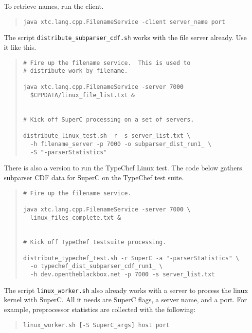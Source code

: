 \documentclass{report}
\newcommand{\SuperC}{{\textsf{Su\-perC}}}
\begin{document}
To retrieve names, run the client.

\begin{quote}
\begin{verbatim}
java xtc.lang.cpp.FilenameService -client server_name port
\end{verbatim}
\end{quote}

The script \verb"distribute_subparser_cdf.sh" works with the file server already.  Use it like this.

\begin{quote}
\begin{verbatim}
# Fire up the filename service.  This is used to
# distribute work by filename.

java xtc.lang.cpp.FilenameService -server 7000
  $CPPDATA/linux_file_list.txt &


# Kick off SuperC processing on a set of servers.

distribute_linux_test.sh -r -s server_list.txt \
  -h filename_server -p 7000 -o subparser_dist_run1_ \
  -S "-parserStatistics"
\end{verbatim}
\end{quote}

There is also a version to run the TypeChef Linux test.  The code
below gathers subparser CDF data for SuperC on the TypeChef test
suite.

\begin{quote}
\begin{verbatim}
# Fire up the filename service.

java xtc.lang.cpp.FilenameService -server 7000 \
  linux_files_complete.txt &


# Kick off TypeChef testsuite processing.

distribute_typechef_test.sh -r SuperC -a "-parserStatistics" \
  -o typechef_dist_subparser_cdf_run1_ \
  -h dev.opentheblackbox.net -p 7000 -s server_list.txt
\end{verbatim}
\end{quote}


The script \verb"linux_worker.sh" also already works with a server to
process the linux kernel with \SuperC{}.  All it needs are \SuperC{}
flags, a server name, and a port.  For example, preprocessor
statistics are collected with the following:


\begin{quote}
\begin{verbatim}
linux_worker.sh [-S SuperC_args] host port
\end{verbatim}
\end{quote}
\end{document}
